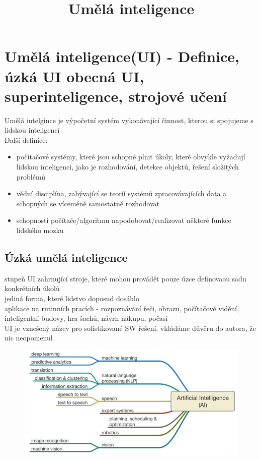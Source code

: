 \title{Umělá inteligence}

\section{Umělá inteligence(UI) - Definice, úzká UI obecná UI, superinteligence, strojové učení}
Umělá intelgince je výpočetní systém vykonávající činnost, kterou si spojujeme s lidskou inteligencí\\
Další definice: 
\begin{itemize}
    \item počítačové systémy, které jsou schopné plnit úkoly, které obvykle vyžadují lidskou inteligenci, jako je rozhodování, detekce objektů, řešení složitých problémů
    \item vědní disciplína, zabývající se teoríí systémů zpracovávajících data a schopných se víceméně samostatně rozhodovat
    \item schopnosti počítače/algoritmu napodobovat/realizovat některé funkce lidského mozku
\end{itemize}
\subsection*{Úzká umělá inteligence}
stupeň UI zahrnující stroje, které mohou provádět pouze úzce definovaou sadu konkrétních úkolů\\
jediná forma, které lidstvo doposud dosáhlo\\
aplikace na rutinních pracích - rozpoznávání řeči, obrazu, počítačové vidění, inteligentní budovy, hra šachů, návrh nákupu, počasí\\
UI je vznešený název pro sofistikované SW řešení, vkládáme důvěru do autora, že nic neopomenul\\
\begin{figure}[H]
    \includegraphics[scale = 1]{images/uzkeAI.png}
\end{figure}
